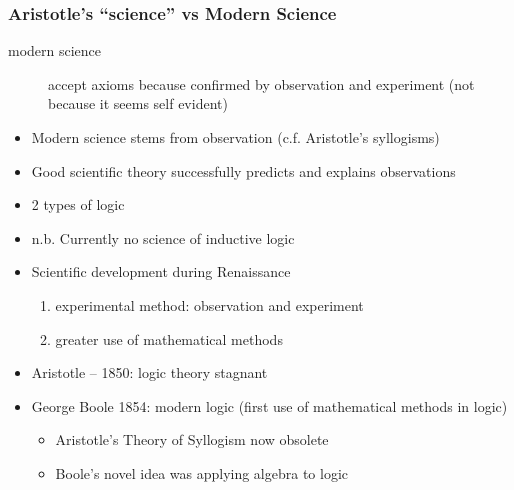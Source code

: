 \subsubsection{Aristotle's ``science'' vs Modern Science}
\begin{description}
	\item[modern science] accept axioms because confirmed by observation and
		experiment (not because it seems self evident)
\end{description}
\begin{itemize}
	\item Modern science stems from observation (c.f. Aristotle's syllogisms)
	\item Good scientific theory successfully predicts and explains
	      observations
	\item 2 types of logic
	\item n.b. Currently no science of inductive logic
	\item Scientific development during Renaissance
	      \begin{enumerate}
		      \item experimental method: observation and experiment
		      \item greater use of mathematical methods
	      \end{enumerate}
	\item Aristotle -- 1850: logic theory stagnant
	\item George Boole 1854: modern logic (first use of mathematical methods in
	      logic)
	      \begin{itemize}
		      \item Aristotle's Theory of Syllogism now obsolete
		      \item Boole's novel idea was applying algebra to logic
	      \end{itemize}
\end{itemize}


